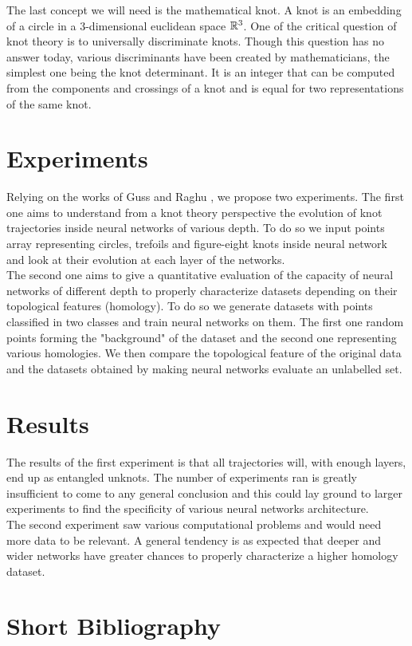 \documentclass[12pt, a4paper]{article}
\begin{document}
\begin{multicols}{2}
The last concept we will need is the mathematical knot. A knot is an embedding of a circle in a $3$-dimensional euclidean space $\mathbb{R}^3$. One of the critical question of knot theory is to universally discriminate knots. Though this question has no answer today, various discriminants have been created by mathematicians, the simplest one being the knot determinant. It is an integer that can be computed from the components and crossings of a knot and is equal for two representations of the same knot.

\section{Experiments}

Relying on the works of Guss \cite{guss_characterizing_2018} and Raghu \cite{raghu_expressive_2017}, we propose two experiments. The first one aims to understand from a knot theory perspective the evolution of knot trajectories inside neural networks of various depth. To do so we input points array representing circles, trefoils and figure-eight knots inside neural network and look at their evolution at each layer of the networks.\\

The second one aims to give a quantitative evaluation of the capacity of neural networks of different depth to properly characterize datasets depending on their topological features (homology). To do so we generate datasets with points classified in two classes and train neural networks on them. The first one random points forming the "background" of the dataset and the second one representing various homologies. We then compare the topological feature of the original data and the datasets obtained by making neural networks evaluate an unlabelled set. 

\section{Results}

The results of the first experiment is that all trajectories will, with enough layers, end up as entangled unknots. The number of experiments ran is greatly insufficient to come to any general conclusion and this could lay ground to larger experiments to find the specificity of various neural networks architecture. \\

The second experiment saw various computational problems and would need more data to be relevant. A general tendency is as expected that deeper and wider networks have greater chances to properly characterize a higher homology dataset. 


\section{Short Bibliography}





\end{multicols}
\end{document}
